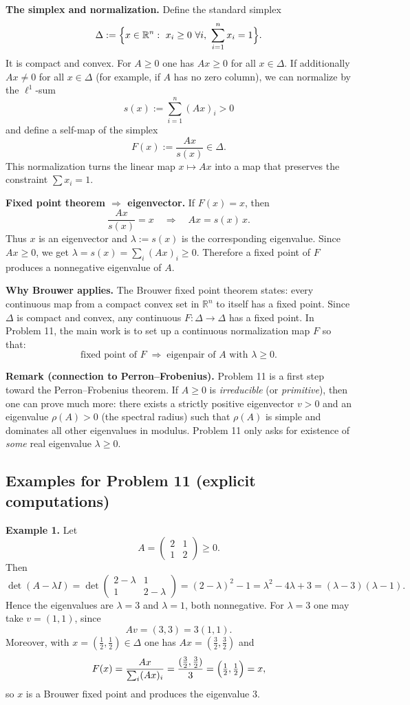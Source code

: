\documentclass[12pt,a4paper]{article}
\theoremstyle{plain}
\theoremstyle{definition}      %
\begin{document}
\medskip
\noindent\textbf{The simplex and normalization.}
Define the standard simplex
\[
\Delta:=\Bigl\{x\in\mathbb{R}^n:\ x_i\ge 0\ \forall i,\ \sum_{i=1}^n x_i=1\Bigr\}.
\]
It is compact and convex. For $A\ge 0$ one has $Ax\ge 0$ for all $x\in\Delta$.
If additionally $Ax\neq 0$ for all $x\in\Delta$ (for example, if $A$ has no zero column),
we can normalize by the $\ell^1$-sum
\[
s(x):=\sum_{i=1}^n (Ax)_i>0
\]
and define a self-map of the simplex
\[
F(x):=\frac{Ax}{s(x)}\in \Delta.
\]
This normalization turns the linear map $x\mapsto Ax$ into a map that preserves the constraint $\sum x_i=1$.

\medskip
\noindent\textbf{Fixed point theorem $\Rightarrow$ eigenvector.}
If $F(x)=x$, then
\[
\frac{Ax}{s(x)}=x \quad\Longrightarrow\quad Ax=s(x)\,x.
\]
Thus $x$ is an eigenvector and $\lambda:=s(x)$ is the corresponding eigenvalue.
Since $Ax\ge 0$, we get $\lambda=s(x)=\sum_i (Ax)_i\ge 0$.
Therefore a fixed point of $F$ produces a nonnegative eigenvalue of $A$.

\medskip
\noindent\textbf{Why Brouwer applies.}
The Brouwer fixed point theorem states: every continuous map from a compact convex set in $\mathbb{R}^n$
to itself has a fixed point. Since $\Delta$ is compact and convex, any continuous $F:\Delta\to\Delta$ has a fixed point.
In Problem 11, the main work is to set up a continuous normalization map $F$ so that:
\[
\text{fixed point of $F$} \;\Longrightarrow\; \text{eigenpair of $A$ with $\lambda\ge 0$}.
\]

\medskip
\noindent\textbf{Remark (connection to Perron--Frobenius).}
Problem 11 is a first step toward the Perron--Frobenius theorem.
If $A\ge 0$ is \emph{irreducible} (or \emph{primitive}), then one can prove much more:
there exists a strictly positive eigenvector $v>0$ and an eigenvalue $\rho(A)>0$
(the spectral radius) such that $\rho(A)$ is simple and dominates all other eigenvalues in modulus.
Problem 11 only asks for existence of \emph{some} real eigenvalue $\lambda\ge 0$.

\subsection*{Examples for Problem 11 (explicit computations)}

\noindent\textbf{Example 1.}
Let
\[
A=\begin{pmatrix}2&1\\1&2\end{pmatrix}\ge 0.
\]
Then
\[
\det(A-\lambda I)=\det\begin{pmatrix}2-\lambda&1\\1&2-\lambda\end{pmatrix}
=(2-\lambda)^2-1=\lambda^2-4\lambda+3=(\lambda-3)(\lambda-1).
\]
Hence the eigenvalues are $\lambda=3$ and $\lambda=1$, both nonnegative.
For $\lambda=3$ one may take $v=(1,1)$, since
\[
Av=(3,3)=3(1,1).
\]
Moreover, with $x=(\tfrac12,\tfrac12)\in\Delta$ one has $Ax=(\tfrac32,\tfrac32)$ and
\[
F(x)=\frac{Ax}{\sum_i (Ax)_i}=\frac{(\tfrac32,\tfrac32)}{3}=\Bigl(\tfrac12,\tfrac12\Bigr)=x,
\]
so $x$ is a Brouwer fixed point and produces the eigenvalue $3$.
\end{document}
